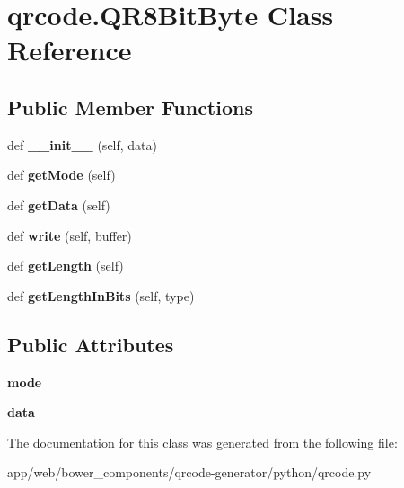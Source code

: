 \hypertarget{classqrcode_1_1_q_r8_bit_byte}{}\section{qrcode.\+Q\+R8\+Bit\+Byte Class Reference}
\label{classqrcode_1_1_q_r8_bit_byte}
\subsection*{Public Member Functions}
\begin{DoxyCompactItemize}
\item 
\mbox{\label{classqrcode_1_1_q_r8_bit_byte_a5d126372b3ba0d65f7194dcc8035b7f2}} 
def {\bfseries \+\_\+\+\_\+init\+\_\+\+\_\+} (self, data)
\item 
\mbox{\label{classqrcode_1_1_q_r8_bit_byte_a157f0c887df9423630dccccc0789dce5}} 
def {\bfseries get\+Mode} (self)
\item 
\mbox{\label{classqrcode_1_1_q_r8_bit_byte_a7feaa9e1d9f475350addc6ff7e5b48d2}} 
def {\bfseries get\+Data} (self)
\item 
\mbox{\label{classqrcode_1_1_q_r8_bit_byte_ad718310429b93bcb25c38c00c9cebcd4}} 
def {\bfseries write} (self, buffer)
\item 
\mbox{\label{classqrcode_1_1_q_r8_bit_byte_ab7a83a19be67e40dba0a6bd153ead894}} 
def {\bfseries get\+Length} (self)
\item 
\mbox{\label{classqrcode_1_1_q_r8_bit_byte_ad84df91c3b72e2c3e9e66a2ce4e26730}} 
def {\bfseries get\+Length\+In\+Bits} (self, type)
\end{DoxyCompactItemize}
\subsection*{Public Attributes}
\begin{DoxyCompactItemize}
\item 
\mbox{\label{classqrcode_1_1_q_r8_bit_byte_a9078afc43f5015edadea8b0badff850a}} 
{\bfseries mode}
\item 
\mbox{\label{classqrcode_1_1_q_r8_bit_byte_a86d814900ccaa6e7882274e457ad5af6}} 
{\bfseries data}
\end{DoxyCompactItemize}


The documentation for this class was generated from the following file\+:\begin{DoxyCompactItemize}
\item 
app/web/bower\+\_\+components/qrcode-\/generator/python/qrcode.\+py\end{DoxyCompactItemize}
